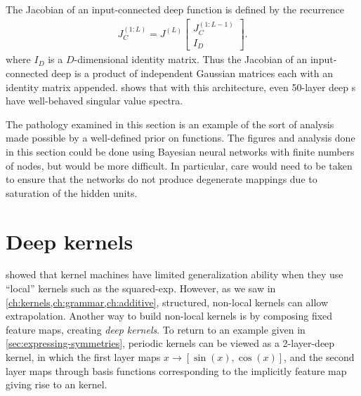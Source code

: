 The Jacobian of an input-connected deep function is defined by the recurrence
%
\newcommand{\sbi}[2]{\left[ \! \begin{array}{c} #1 \\ #2 \end{array} \! \right]} 
\begin{align}
{J_C^{(1:L)} = J^{(L)} \sbi{ J_C^{(1:L-1)}}{I_D}}.
\end{align}
%
%
%
where $I_D$ is a $D$-dimensional identity matrix.
Thus the Jacobian of an input-connected deep \gp{} is a product of independent Gaussian matrices each with an identity matrix appended.
 shows that with this architecture, even 50-layer deep \gp{}s have well-behaved singular value spectra.

The pathology examined in this section is an example of the sort of analysis made possible by a well-defined prior on functions.
The figures and analysis done in this section could be done using Bayesian neural networks with finite numbers of nodes, but would be more difficult.
In particular, care would need to be taken to ensure that the networks do not produce degenerate mappings due to saturation of the hidden units.





\section{Deep kernels}
\label{sec:deep_kernels}

\cite{ bengio2006curse} showed that kernel machines have limited generalization ability when they use ``local'' kernels such as the squared-exp.
However, as we saw in \cref{ch:kernels,ch:grammar,ch:additive}, structured, non-local kernels can 
allow extrapolation.
Another way to build non-local kernels is by composing fixed feature maps, creating \emph{deep kernels}.
To return to an example given in \cref{sec:expressing-symmetries}, periodic kernels can be viewed as a 2-layer-deep kernel, in which the first layer maps $x \rightarrow [\sin(x), \cos(x)]$, and the second layer maps through basis functions corresponding to the implicitly feature map giving rise to an \kSE{} kernel.


